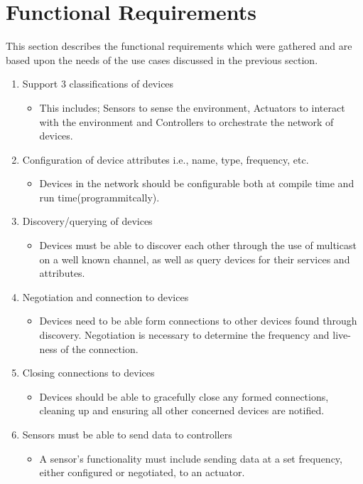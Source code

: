 \section{Functional Requirements} %
\label{sec:functional_requirements}
This section describes the functional requirements which were gathered and are based upon the needs of the use cases discussed in the previous section.
\begin{enumerate}
	\item Support 3 classifications of devices
	\begin{itemize}
		\item This includes; Sensors to sense the environment, Actuators to interact with the environment and Controllers to orchestrate the network of devices.
	\end{itemize}
	\item Configuration of device attributes i.e., name, type, frequency, etc.
	\begin{itemize}
		\item Devices in the network should be configurable both at compile time and run time(programmitcally). 
	\end{itemize}
	\item Discovery/querying of devices
	\begin{itemize}
		\item Devices must be able to discover each other through the use of multicast on a well known channel, as well as query devices for their services and attributes.
	\end{itemize}
	\item Negotiation and connection to devices
	\begin{itemize}
		\item Devices need to be able form connections to other devices found through discovery. Negotiation is necessary to determine the frequency and live-ness of the connection.
	\end{itemize}
	\item Closing connections to devices
	\begin{itemize}
		\item Devices should be able to gracefully close any formed connections, cleaning up and ensuring all other concerned devices are notified.
	\end{itemize}
	\item Sensors must be able to send data to controllers
	\begin{itemize}
		\item A sensor's functionality must include sending data at a set frequency, either configured or negotiated, to an actuator.

\end{itemize}
\end{enumerate}
